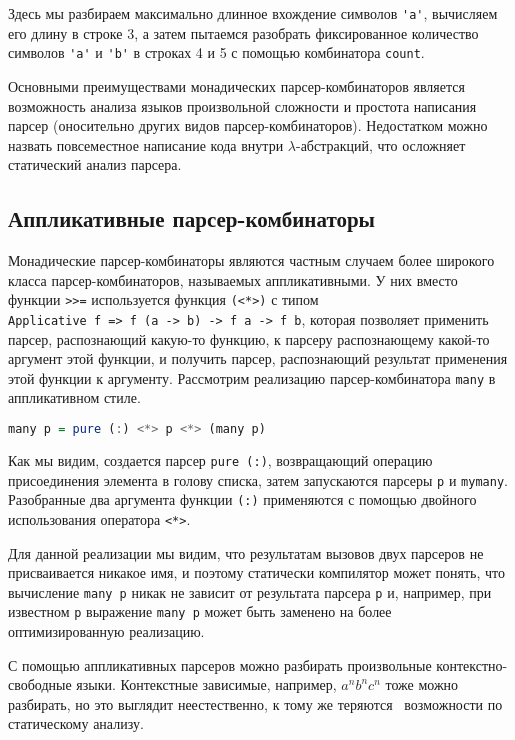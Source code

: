 Здесь мы разбираем максимально длинное вхождение символов \verb='a'=, вычисляем его длину в строке 3, а затем пытаемся разобрать фиксированное количество символов \verb='a'= и \verb='b'= в строках 4 и 5 с помощью комбинатора \verb=count=.

Основными преимуществами монадических парсер-комбинаторов является возможность анализа языков произвольной сложности и простота написания парсер (оносительно других видов парсер-комбинаторов). Недостатком можно назвать повсеместное написание кода внутри $\lambda$-абстракций, что осложняет статический анализ парсера.

\subsection{Аппликативные парсер-комбинаторы}

Монадические парсер-комбинаторы являются частным случаем более широкого класса парсер-комбинаторов, называемых аппликативными.
У них вместо функции \verb|>>=| используется функция 
\verb|(<*>)| с типом \\
\verb|Applicative f => f (a -> b) -> f a -> f b|, которая позволяет применить парсер, распознающий какую-то функцию, к парсеру распознающему какой-то аргумент этой функции, и получить парсер, распознающий результат применения этой функции к аргументу. Рассмотрим реализацию парсер-комбинатора \verb=many= в аппликативном стиле.
 
\begin{lstlisting}[language=haskell]
many p = pure (:) <*> p <*> (many p)
\end{lstlisting}
\noindent Как мы видим, создается парсер \verb=pure (:)=, возвращающий операцию присоединения элемента в голову списка,
затем запускаются парсеры \verb=p= и \verb=mymany=. Разобранные два аргумента функции \verb=(:)= применяются с помощью двойного использования оператора \verb=<*>=.

Для данной реализации мы видим, что результатам вызовов двух парсеров не присваивается никакое имя, и поэтому статически компилятор может понять, что вычисление \verb=many p= никак не зависит от результата парсера \verb=p= и, например, при известном \verb=p= выражение \verb=many p= может быть заменено на более оптимизированную реализацию.

С помощью аппликативных парсеров можно разбирать произвольные контекстно-свободные языки. Контекстные зависимые, например, $a^nb^nc^n$ тоже можно разбирать, но это выглядит неестественно, к тому же теряются~\cite{CS_applicative} возможности по статическому анализу.


